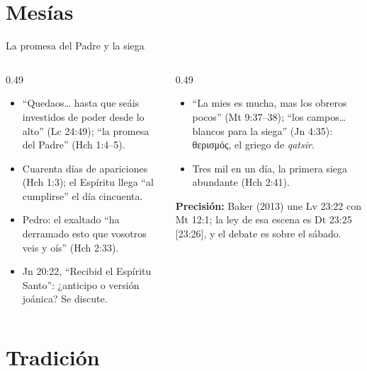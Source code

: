 \documentclass[hyperref={bookmarks=false},aspectratio=169]{beamer}
\newcommand{\grc}[1]{\foreignlanguage{ancientgreek}{#1}}
\newcommand{\precision}[1]{{\footnotesize\color{sepia}\textbf{Precisión:} #1}}
\begin{document}
\section{Mesías}

\begin{frame}{La promesa del Padre y la siega}
\begin{columns}[t,onlytextwidth]
\begin{column}{0.49\textwidth}\small\RaggedRight
\begin{itemize}
\item ``Quedaos\ldots{} hasta que seáis investidos de poder desde lo alto'' (Lc 24:49); ``la promesa del Padre'' (Hch 1:4--5).
\item Cuarenta días de apariciones (Hch 1:3); el Espíritu llega ``al cumplirse'' el día cincuenta.
\item Pedro: el exaltado ``ha derramado esto que vosotros veis y oís'' (Hch 2:33).
\item Jn 20:22, ``Recibid el Espíritu Santo'': ¿anticipo o versión joánica? Se discute.
\end{itemize}
\end{column}
\begin{column}{0.49\textwidth}\small\RaggedRight
\begin{itemize}
\item ``La mies es mucha, mas los obreros pocos'' (Mt 9:37--38); ``los campos\ldots{} blancos para la siega'' (Jn 4:35): \grc{θερισμός}, el griego de \emph{qatsir}.
\item Tres mil en un día, la primera siega abundante (Hch 2:41).
\end{itemize}
\precision{Baker (2013) une Lv 23:22 con Mt 12:1; la ley de esa escena es Dt 23:25 [23:26], y el debate es sobre el sábado.}
\end{column}
\end{columns}
\end{frame}

\section{Tradición}
\end{document}
